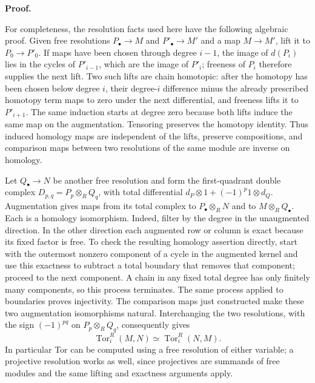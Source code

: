 \documentclass[11pt,a4paper,openany]{report}
\begin{document}
\textbf{Proof.}

For completeness, the resolution facts used here have the following algebraic proof. Given free resolutions \(P_\bullet\to M\) and \(P'_\bullet\to M'\) and a map \(M\to M'\), lift it to \(P_0\to P'_0\). If maps have been chosen through degree \(i-1\), the image of \(d(P_i)\) lies in the cycles of \(P'_{i-1}\), which are the image of \(P'_i\); freeness of \(P_i\) therefore supplies the next lift. Two such lifts are chain homotopic: after the homotopy has been chosen below degree \(i\), their degree-\(i\) difference minus the already prescribed homotopy term maps to zero under the next differential, and freeness lifts it to \(P'_{i+1}\). The same induction starts at degree zero because both lifts induce the same map on the augmentation. Tensoring preserves the homotopy identity. Thus induced homology maps are independent of the lifts, preserve compositions, and comparison maps between two resolutions of the same module are inverse on homology.

Let \(Q_\bullet\to N\) be another free resolution and form the first-quadrant double complex \(D_{p,q}=P_p\otimes_R Q_q\), with total differential \(d_P\otimes1+(-1)^p1\otimes d_Q\). Augmentation gives maps from its total complex to \(P_\bullet\otimes_R N\) and to \(M\otimes_R Q_\bullet\). Each is a homology isomorphism. Indeed, filter by the degree in the unaugmented direction. In the other direction each augmented row or column is exact because its fixed factor is free. To check the resulting homology assertion directly, start with the outermost nonzero component of a cycle in the augmented kernel and use this exactness to subtract a total boundary that removes that component; proceed to the next component. A chain in any fixed total degree has only finitely many components, so this process terminates. The same process applied to boundaries proves injectivity. The comparison maps just constructed make these two augmentation isomorphisms natural. Interchanging the two resolutions, with the sign \((-1)^{pq}\) on \(P_p\otimes_RQ_q\), consequently gives \[
\operatorname{Tor}_i^R(M,N)\simeq\operatorname{Tor}_i^R(N,M).
\] In particular Tor can be computed using a free resolution of either variable; a projective resolution works as well, since projectives are summands of free modules and the same lifting and exactness arguments apply.
\end{document}
